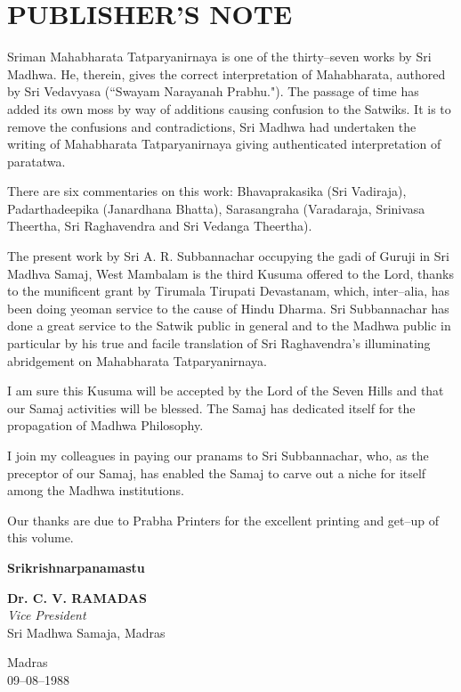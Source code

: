 
\chapter*{PUBLISHER'S NOTE}

Sriman Mahabharata Tatparyanirnaya is one of the thirty–seven works by Sri Madhwa. He, therein, gives the correct interpretation of Mahabharata, authored by Sri Vedavyasa (“Swayam Narayanah Prabhu."). The passage of time has added its own moss by way of additions causing confusion to the Satwiks. It is to remove the confusions and contradictions, Sri Madhwa had undertaken the writing of Mahabharata Tatparyanirnaya giving authenticated interpretation of paratatwa.

There are six commentaries on this work: Bhavaprakasika (Sri Vadiraja), Padarthadeepika (Janardhana Bhatta), Sarasangraha (Varadaraja, Srinivasa Theertha, Sri Raghavendra and Sri Vedanga Theertha).

The present work by Sri A. R. Subbannachar occupying the gadi of Guruji in Sri Madhva Samaj, West Mambalam is the third Kusuma offered to the Lord, thanks to the munificent grant by Tirumala Tirupati Devastanam, which, inter–alia, has been doing yeoman service to the cause of Hindu Dharma. Sri Subbannachar has done a great service to the Satwik public in general and to the Madhwa public in particular by his true and facile translation of Sri Raghavendra's illuminating abridgement on Mahabharata Tatparyanirnaya.

\newpage

I am sure this Kusuma will be accepted by the Lord of the Seven Hills and that our Samaj activities will be blessed. The Samaj has dedicated itself for the propagation of Madhwa Philosophy.

I join my colleagues in paying our pranams to Sri Subbannachar, who, as the preceptor of our Samaj, has enabled the Samaj to carve out a niche for itself among the Madhwa institutions.

Our thanks are due to Prabha Printers for the excellent printing and get–up of this volume.

\begin{center}
\textbf{Srikrishnarpanamastu}
\end{center}

\begin{flushright}
\textbf{Dr. C. V. RAMADAS}\\\textit{Vice President}\\ Sri Madhwa Samaja, Madras
\end{flushright}

\begin{flushleft}
Madras \\ 09–08–1988
\end{flushleft}

